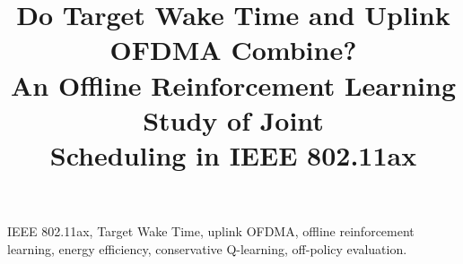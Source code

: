 \documentclass[conference]{IEEEtran}
\begin{document}
\title{Do Target Wake Time and Uplink OFDMA Combine?\\
An Offline Reinforcement Learning Study of Joint\\
Scheduling in IEEE 802.11ax}

\author{
}

\maketitle

\begin{IEEEkeywords}
IEEE 802.11ax, Target Wake Time, uplink OFDMA, offline reinforcement learning,
energy efficiency, conservative Q-learning, off-policy evaluation.
\end{IEEEkeywords}












\end{document}
